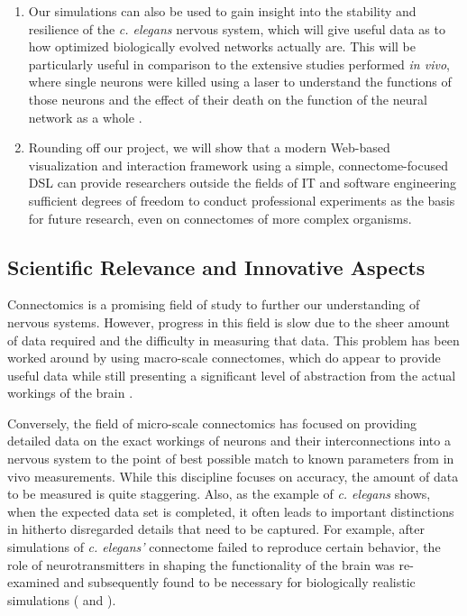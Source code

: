 \documentclass[a4paper,11pt]{article}
\begin{document}
\begin{enumerate}
\item Our simulations can also be used to gain insight into the stability and resilience of the \emph{c. elegans} nervous system, which will give useful data as to how optimized biologically evolved networks actually are. This will be particularly useful in comparison to the extensive studies performed \emph{in vivo}, where single neurons were killed using a laser to understand the functions of those neurons and the effect of their death on the function of the neural network as a whole \citep{rothman2012caenorhabditis}.
\item Rounding off our project, we will show that a modern Web-based visualization and interaction framework using a simple, connectome-focused DSL can provide researchers outside the fields of IT and software engineering sufficient degrees of freedom to conduct professional experiments as the basis for future research, even on connectomes of more complex organisms.
\end{enumerate}


\subsection{Scientific Relevance and Innovative Aspects}
Connectomics is a promising field of study to further our understanding of nervous systems. However, progress in this field is slow due to the sheer amount of data required and the difficulty in measuring that data. This problem has been worked around by using macro-scale connectomes, which do appear to provide useful data while still presenting a significant level of abstraction from the actual workings of the brain \citep{TheMissingArticle}.

Conversely, the field of micro-scale connectomics has focused on providing detailed data on the exact workings of neurons and their interconnections into a nervous system to the point of best possible match to known parameters from in vivo measurements. While this discipline focuses on accuracy, the amount of data to be measured is quite staggering. Also, as the example of \emph{c. elegans} shows, when the expected data set is completed, it often leads to important distinctions in hitherto disregarded details that need to be captured. For example, after simulations of \emph{c. elegans'} connectome failed to reproduce certain behavior, the role of neurotransmitters in shaping the functionality of the brain was re-examined and subsequently found to be necessary for biologically realistic simulations ( \citep{Izquierdo2013} and \citep{Ogg1997}). %
\end{document}
